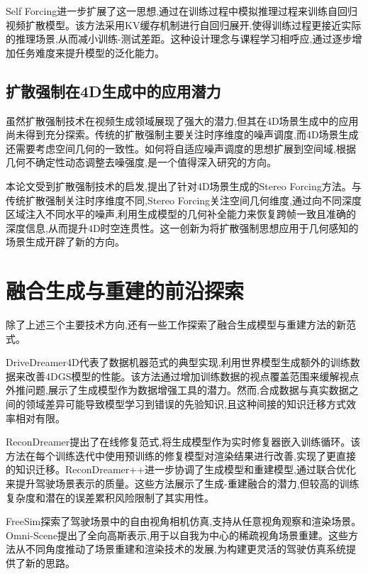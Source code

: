 Self Forcing\cite{huang2025self}进一步扩展了这一思想,通过在训练过程中模拟推理过程来训练自回归视频扩散模型。该方法采用KV缓存机制进行自回归展开,使得训练过程更接近实际的推理场景,从而减小训练-测试差距。这种设计理念与课程学习相呼应,通过逐步增加任务难度来提升模型的泛化能力。

\subsection{扩散强制在4D生成中的应用潜力}

虽然扩散强制技术在视频生成领域展现了强大的潜力,但其在4D场景生成中的应用尚未得到充分探索。传统的扩散强制主要关注时序维度的噪声调度,而4D场景生成还需要考虑空间几何的一致性。如何将自适应噪声调度的思想扩展到空间域,根据几何不确定性动态调整去噪强度,是一个值得深入研究的方向。

本论文受到扩散强制技术的启发,提出了针对4D场景生成的Stereo Forcing方法。与传统扩散强制关注时序维度不同,Stereo Forcing关注空间几何维度,通过向不同深度区域注入不同水平的噪声,利用生成模型的几何补全能力来恢复跨帧一致且准确的深度信息,从而提升4D时空连贯性。这一创新为将扩散强制思想应用于几何感知的场景生成开辟了新的方向。

\section{融合生成与重建的前沿探索}

除了上述三个主要技术方向,还有一些工作\cite{zhao2024drivedreamer4d,zhao2025drivedreamer4d_cvpr,ni2025recondreamer,zhao2025recondreamerpp,fan2024freesim,wei2025omniscene}探索了融合生成模型与重建方法的新范式。

DriveDreamer4D代表了数据机器范式的典型实现,利用世界模型生成额外的训练数据来改善4DGS模型的性能\cite{zhao2024drivedreamer4d,zhao2025drivedreamer4d_cvpr}。该方法通过增加训练数据的视点覆盖范围来缓解视点外推问题,展示了生成模型作为数据增强工具的潜力。然而,合成数据与真实数据之间的领域差异可能导致模型学习到错误的先验知识,且这种间接的知识迁移方式效率相对有限。

ReconDreamer提出了在线修复范式,将生成模型作为实时修复器嵌入训练循环\cite{ni2025recondreamer}。该方法在每个训练迭代中使用预训练的修复模型对渲染结果进行改善,实现了更直接的知识迁移。ReconDreamer++进一步协调了生成模型和重建模型,通过联合优化来提升驾驶场景表示的质量\cite{zhao2025recondreamerpp}。这些方法展示了生成-重建融合的潜力,但较高的训练复杂度和潜在的误差累积风险限制了其实用性。

FreeSim探索了驾驶场景中的自由视角相机仿真,支持从任意视角观察和渲染场景\cite{fan2024freesim}。Omni-Scene提出了全向高斯表示,用于以自我为中心的稀疏视角场景重建\cite{wei2025omniscene}。这些方法从不同角度推动了场景重建和渲染技术的发展,为构建更灵活的驾驶仿真系统提供了新的思路。

